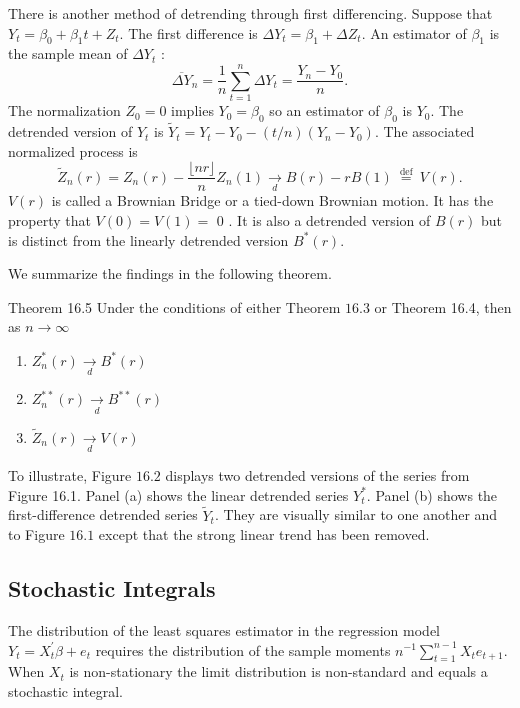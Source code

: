 \documentclass[10pt]{article}
\begin{document}
There is another method of detrending through first differencing. Suppose that $Y_{t}=\beta_{0}+\beta_{1} t+Z_{t}$. The first difference is $\Delta Y_{t}=\beta_{1}+\Delta Z_{t}$. An estimator of $\beta_{1}$ is the sample mean of $\Delta Y_{t}$ :
$$
\overline{\Delta Y}_{n}=\frac{1}{n} \sum_{t=1}^{n} \Delta Y_{t}=\frac{Y_{n}-Y_{0}}{n} .
$$
The normalization $Z_{0}=0$ implies $Y_{0}=\beta_{0}$ so an estimator of $\beta_{0}$ is $Y_{0}$. The detrended version of $Y_{t}$ is $\widetilde{Y}_{t}=Y_{t}-Y_{0}-(t / n)\left(Y_{n}-Y_{0}\right)$. The associated normalized process is
$$
\widetilde{Z}_{n}(r)=Z_{n}(r)-\frac{\lfloor n r\rfloor}{n} Z_{n}(1) \underset{d}{\longrightarrow} B(r)-r B(1) \stackrel{\text { def }}{=} V(r) .
$$
$V(r)$ is called a Brownian Bridge or a tied-down Brownian motion. It has the property that $V(0)=V(1)=$ 0 . It is also a detrended version of $B(r)$ but is distinct from the linearly detrended version $B^{*}(r)$.

We summarize the findings in the following theorem.

Theorem 16.5 Under the conditions of either Theorem $16.3$ or Theorem 16.4, then as $n \rightarrow \infty$

\begin{enumerate}
  \item $Z_{n}^{*}(r) \underset{d}{\longrightarrow} B^{*}(r)$

  \item $Z_{n}^{* *}(r) \underset{d}{\longrightarrow} B^{* *}(r)$

  \item $\widetilde{Z}_{n}(r) \underset{d}{\longrightarrow} V(r)$

\end{enumerate}
To illustrate, Figure $16.2$ displays two detrended versions of the series from Figure 16.1. Panel (a) shows the linear detrended series $Y_{t}^{*}$. Panel (b) shows the first-difference detrended series $\widetilde{Y}_{t}$. They are visually similar to one another and to Figure $16.1$ except that the strong linear trend has been removed.

\subsection{Stochastic Integrals}
The distribution of the least squares estimator in the regression model $Y_{t}=X_{t}^{\prime} \beta+e_{t}$ requires the distribution of the sample moments $n^{-1} \sum_{t=1}^{n-1} X_{t} e_{t+1}$. When $X_{t}$ is non-stationary the limit distribution is non-standard and equals a stochastic integral.
\end{document}
